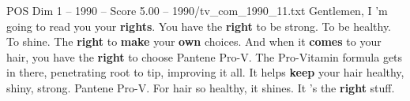 \begin{textsample}{POS Dim 1 – 1990 – Score 5.00 – 1990/tv\_com\_1990\_11.txt}  \label{ex:f1_pos_055}
Gentlemen, I 'm going to read you your \textbf{rights}.
You have the \textbf{right} to be strong.
To be healthy.
To shine.
The \textbf{right} to \textbf{make} your \textbf{own} choices.
And when it \textbf{comes} to your hair, you have the \textbf{right} to choose Pantene Pro-V.
The Pro-Vitamin formula gets in there, penetrating root to tip, improving it all.
It helps \textbf{keep} your hair healthy, shiny, strong.
Pantene Pro-V.
For hair so healthy, it shines.
It 's the \textbf{right} stuff.

\end{textsample}
